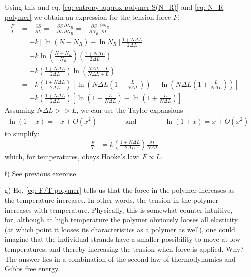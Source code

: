 \documentclass[11pt]{article}
\newcounter{excount}
\newenvironment{exercise}[1][]{\addtocounter{excount}{1} \noindent {\bf Exercise
    \arabic{excount} #1}\hspace{2mm}}{\vspace{4mm}}
\begin{document}
\begin{exercise}
\begin{itemize}
			Using this and eq. \eqref{eq: entropy approx polymer S(N_R)} and \eqref{eq: N_R polymer} we obtain an expression for the tension force $F$:
			\begin{align*}
				\frac{F}{T} 	&= -\frac{\partial S}{\partial L} = -\frac{\partial S}{\partial L} \frac{\partial N_R}{\partial N_R} = -\frac{\partial S}{\partial N_R} \frac{\partial N_R}{\partial L} \\
									&= -k\left[ \ln (N-N_R) - \ln N_R \right] \frac{1+N\Delta L}{2\Delta L} \\
									&= -k \ln \left( \frac{N-N_R}{N_R} \right) \left( \frac{1+N\Delta L}{2\Delta L} \right) \\
									&= -k\left( \frac{1+N\Delta L}{2\Delta L} \right) \ln \left( \frac{N\Delta L - L}{N\Delta L + L} \right) \\
									&= -k\left( \frac{1+N\Delta L}{2\Delta L} \right) \left[ \ln \left( N\Delta L \left( 1- \frac{L}{N\Delta L} \right)  \right) -\ln \left( N\Delta L \left( 1+\frac{L}{N\Delta L} \right)  \right)  \right] \\
									&= -k\left( \frac{1+N\Delta L}{2\Delta L} \right) \left[ \ln \left( 1-\frac{L}{N\Delta L} \right) - \ln \left( 1+ \frac{L}{N\Delta L} \right) \right]
			\end{align*}
			Assuming $N\Delta L >> L$, we can use the Taylor expansions
			\begin{align*}
				\ln (1-x) = -x + O(x^2) \qquad \qquad \mathrm{and} \qquad \qquad \ln (1+x) = x + O(x^2)
			\end{align*}
			to simplify:
			\begin{align}
				\frac{F}{T}		&= k\left( \frac{1+N\Delta L}{2\Delta L} \right) \frac{2L}{N\Delta L} \label{eq: F/T polymer}
			\end{align}
			which, for temperatures, obeys Hooke's law: $F \propto L$.
			
			
			
		\item[f)]
			See previous exercise.
		
		\item[g)]
			Eq. \eqref{eq: F/T polymer} tells us that the force in the polymer increases as the temperature increases. In other words, the tension in the polymer increases with temperature. Physically, this is somewhat counter intuitive, for, although at high temperature the polymer obviously looses all elasticity (at which point it looses its characteristics as a polymer as well), one could imagine that the individual strands have a smaller possibility to move at low temperatures, and thereby increasing the tension when force is applied. Why? The answer lies in a combination of the second law of thermodynamics and Gibbs free energy.
		

\end{itemize}
\end{exercise}
\end{document}
